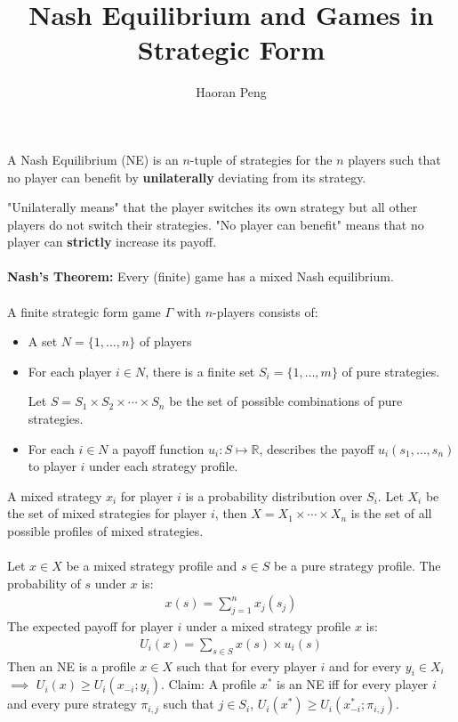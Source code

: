 \documentclass{article}
\begin{document}
\title{Nash Equilibrium and Games in Strategic Form}
\author{Haoran Peng}
\maketitle
A Nash Equilibrium (NE) is an $n$-tuple of strategies for the $n$ players such that no player can benefit by \textbf{unilaterally} deviating from its strategy. 

"Unilaterally means" that the player switches its own strategy but all other players do not switch their strategies. "No player can benefit" means that no player can \textbf{strictly} increase its payoff.
\\~\\
\textbf{Nash's Theorem: } Every (finite) game has a mixed Nash equilibrium. 
\\~\\
A finite strategic form game $\Gamma$ with $n$-players consists of:
\begin{itemize}
\item A set $N = \{1,\ldots, n\}$ of players
\item For each player $i\in N$, there is a finite set $S_i = \{1,\ldots, m\}$ of pure strategies.

Let $S = S_1\times S_2\times \cdots \times S_n$ be the set of possible combinations of pure strategies.
\item For each $i\in N$ a payoff function $u_i : S \mapsto \mathbb{R}$, describes the payoff $u_i(s_1, \ldots, s_n)$ to player $i$ under each strategy profile.
\end{itemize}

A mixed strategy $x_i$ for player $i$ is a probability distribution over $S_i$. Let $X_i$ be the set of mixed strategies for player $i$, then $X = X_1 \times \cdots\times X_n$ is the set of all possible profiles of mixed strategies.
\\~\\
Let $x\in X$ be a mixed strategy profile and $s \in S$ be a pure strategy profile. The probability of $s$ under $x$ is:
\begin{align*}
x(s) = \sum_{j=1}^{n} x_j(s_j)
\end{align*}
The expected payoff for player $i$ under a mixed strategy profile $x$ is:
\begin{align*}
U_i(x) = \sum_{s\in S} x(s) \times u_i(s)
\end{align*} 
Then an NE is a profile $x\in X$ such that for every player $i$ and for every $y_i \in X_i$ $\implies$ $U_i(x) \ge U_i(x_{-i}; y_i)$.
\newpage
Claim: A profile $x^*$ is an NE iff for every player $i$ and every pure strategy $\pi_{i,j}$ such that $j\in S_i$, $U_i(x^*)\ge U_i(x^*_{-i}; \pi_{i, j})$.
\end{document}

